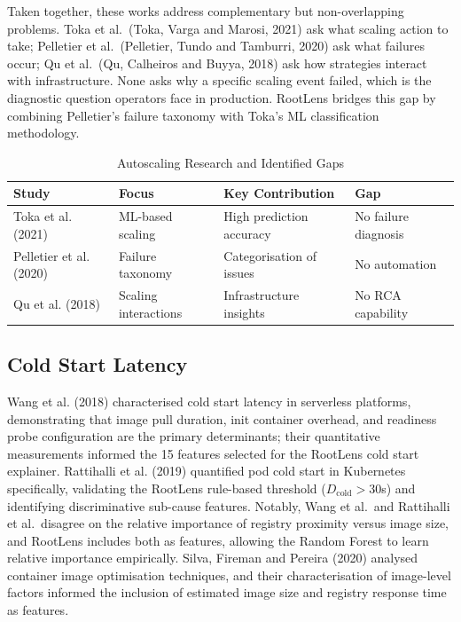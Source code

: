 Taken together, these works address complementary but non-overlapping problems. Toka et al.\ (Toka, Varga and Marosi, 2021) ask what scaling action to take; Pelletier et al.\ (Pelletier, Tundo and Tamburri, 2020) ask what failures occur; Qu et al.\ (Qu, Calheiros and Buyya, 2018) ask how strategies interact with infrastructure. None asks why a specific scaling event failed, which is the diagnostic question operators face in production. RootLens bridges this gap by combining Pelletier's failure taxonomy with Toka's ML classification methodology.

\begin{table}[H]
\centering
\begin{tabularx}{\textwidth}{|X|X|X|X|}
\hline
\textbf{Study} & \textbf{Focus} & \textbf{Key Contribution} & \textbf{Gap} \\ \hline

Toka et al. (2021) & ML-based scaling & High prediction accuracy & No failure diagnosis \\ \hline

Pelletier et al. (2020) & Failure taxonomy & Categorisation of issues & No automation \\ \hline

Qu et al. (2018) & Scaling interactions & Infrastructure insights & No RCA capability \\ \hline

\end{tabularx}
\caption{Autoscaling Research and Identified Gaps}
\end{table}

\subsection{Cold Start Latency}
Wang et al. (2018) characterised cold start latency in serverless platforms, demonstrating that image pull duration, init container overhead, and readiness probe configuration are the primary determinants; their quantitative measurements informed the 15 features selected for the RootLens cold start explainer. Rattihalli et al. (2019) quantified pod cold start in Kubernetes specifically, validating the RootLens rule-based threshold ($D_{\text{cold}} > 30$s) and identifying discriminative sub-cause features. Notably, Wang et al.\ and Rattihalli et al.\ disagree on the relative importance of registry proximity versus image size, and RootLens includes both as features, allowing the Random Forest to learn relative importance empirically. Silva, Fireman and Pereira (2020) analysed container image optimisation techniques, and their characterisation of image-level factors informed the inclusion of estimated image size and registry response time as features.

